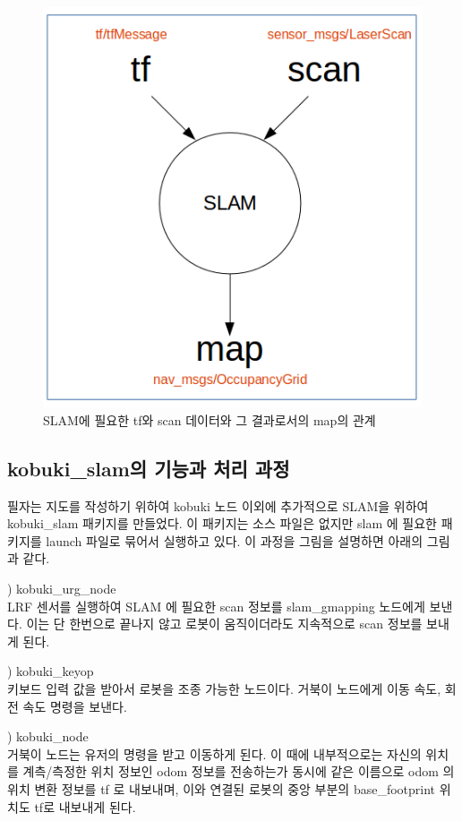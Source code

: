 \begin{figure}[h]
\centering
\includegraphics[width=0.7\columnwidth]{pictures/chapter11/tf_scan_slam_map.png}
\caption{SLAM에 필요한 tf와 scan 데이터와 그 결과로서의 map의 관계}
\end{figure}

\subsection{kobuki\_slam의 기능과 처리 과정}

필자는 지도를 작성하기 위하여 kobuki 노드 이외에 추가적으로 SLAM을 위하여 kobuki\_slam 패키지를 만들었다. 이 패키지는 소스 파일은 없지만 slam 에 필요한 패키지를 launch 파일로 묶어서 실행하고 있다. 이 과정을 그림을 설명하면 아래의 그림과 같다.  

\setcounter{num}{0}

\vspace{\baselineskip}
\noindent
{}
\thenum) kobuki\_urg\_node\\
LRF 센서를 실행하여 SLAM 에 필요한 scan 정보를 slam\_gmapping 노드에게 보낸다. 이는 단 한번으로 끝나지 않고 로봇이 움직이더라도 지속적으로 scan 정보를 보내게 된다.

\vspace{\baselineskip}
\noindent
{}
\thenum) kobuki\_keyop\\
키보드 입력 값을 받아서 로봇을 조종 가능한 노드이다. 거북이 노드에게 이동 속도, 회전 속도 명령을 보낸다.

\vspace{\baselineskip}
\noindent
{}
\thenum) kobuki\_node\\
거북이 노드는 유저의 명령을 받고 이동하게 된다. 이 때에 내부적으로는 자신의 위치를 계측/측정한 위치 정보인 odom 정보를 전송하는가 동시에 같은 이름으로 odom 의 위치 변환 정보를 tf 로 내보내며, 이와 연결된 로봇의 중앙 부분의 base\_footprint 위치도 tf로 내보내게 된다.

